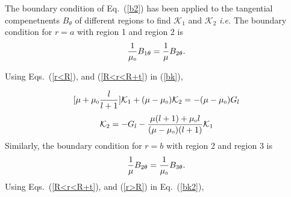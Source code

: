 The boundary condition of Eq.~(\ref{b2}) has been applied to the tangential compenetnents $B_\theta$ of different regions to find \(\mathcal{K}_1\) and \(\mathcal{K}_2\) \textit{i.e.}
The boundary condition for $r=a$ with region 1 and region 2 is
\begin{equation}\label{bk}
\frac{1}{\mu_{\scriptscriptstyle 0}} B_{1\theta}=  \frac{1}{\mu} B_{2\theta}{\rm .} 
\end{equation}

Using Eqs.~(\ref{r<R}), and (\ref{R<r<R+t}) in (\ref{bk}),





\begin{equation}\label{es1}
[\mu+\mu_{\scriptscriptstyle 0}\frac{l}{l+1}]\mathcal{K}_1 +(\mu-\mu_{\scriptscriptstyle 0})\mathcal{K}_2=-(\mu-\mu_{\scriptscriptstyle 0})G_l
\end{equation}
\begin{equation}\label{k2}
\mathcal{K}_2=-G_l-\frac{\mu(l+1)+\mu_{\scriptscriptstyle 0} l}{(\mu-\mu_{\scriptscriptstyle 0})(l+1)}\mathcal{K}_1
\end{equation}
Similarly, the boundary condition for $r=b$ with region 2 and region 3 is 
\begin{equation}\label{bk2}
    \frac{1}{\mu} B_{2\theta}=\frac{1}{\mu_{\scriptscriptstyle 0}}B_{3\theta}{\rm .}
\end{equation}
Using Eqs.~(\ref{R<r<R+t}), and (\ref{r>R}) in Eq.~(\ref{bk2}),


